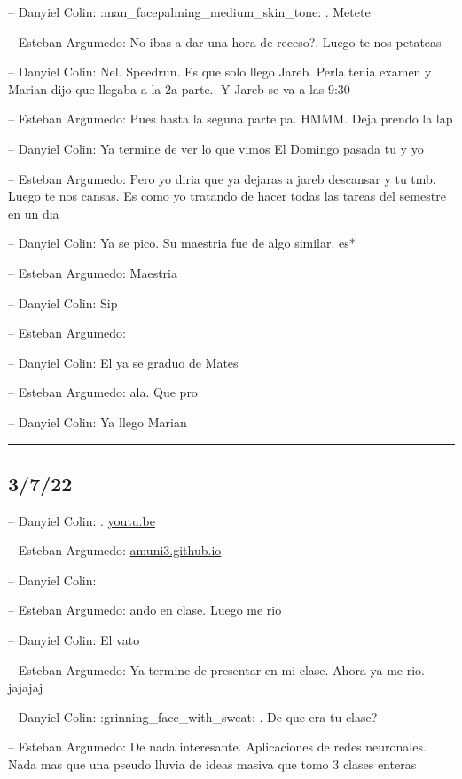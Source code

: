 -- Danyiel Colin: :man\_facepalming\_medium\_skin\_tone: . Metete

-- Esteban Argumedo: No ibas a dar una hora de receso?. Luego te nos
petateas

-- Danyiel Colin: Nel. Speedrun. Es que solo llego Jareb. Perla tenia
examen y Marian dijo que llegaba a la 2a parte.. Y Jareb se va a las
9:30

-- Esteban Argumedo: Pues hasta la seguna parte pa. HMMM. Deja prendo la
lap

-- Danyiel Colin: Ya termine de ver lo que vimos El Domingo pasada tu y
yo

-- Esteban Argumedo: Pero yo diria que ya dejaras a jareb descansar y tu
tmb. Luego te nos cansas. Es como yo tratando de hacer todas las tareas
del semestre en un dia

-- Danyiel Colin: Ya se pico. Su maestria fue de algo similar. es*

-- Esteban Argumedo: Maestria

-- Danyiel Colin: Sip

-- Esteban Argumedo:

-- Danyiel Colin: El ya se graduo de Mates

-- Esteban Argumedo: ala. Que pro

-- Danyiel Colin: Ya llego Marian

\begin{center}\rule{0.5\linewidth}{0.5pt}\end{center}

\hypertarget{section-26}{%
\subsection{3/7/22}\label{section-26}}

-- Danyiel Colin: . \href{https://youtu.be/2kUq0X8jJRI}{youtu.be}

-- Esteban Argumedo:
\href{https://amuni3.github.io/Portfolio/9_project/}{amuni3.github.io}

-- Danyiel Colin:

-- Esteban Argumedo: ando en clase. Luego me rio

-- Danyiel Colin: El vato

-- Esteban Argumedo: Ya termine de presentar en mi clase. Ahora ya me
rio. jajajaj

-- Danyiel Colin: :grinning\_face\_with\_sweat: . De que era tu clase?

-- Esteban Argumedo: De nada interesante. Aplicaciones de redes
neuronales. Nada mas que una pseudo lluvia de ideas masiva que tomo 3
clases enteras

